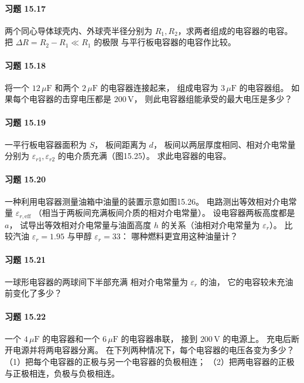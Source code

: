 \paragraph{习题 15.17}
两个同心导体球壳内、外球壳半径分别为
\(R_1,R_2\)，求两者组成的电容器的电容。
把 \(\Delta R=R_2-R_1\ll R_1\) 的极限
与平行板电容器的电容作比较。

\paragraph{习题 15.18}
将一个 \(12\,\mu\mathrm F\) 和两个
\(2\,\mu\mathrm F\) 的电容器连接起来，
组成电容为 \(3\,\mu\mathrm F\) 的电容器组。
如果每个电容器的击穿电压都是
\(200\,\mathrm V\)，
则此电容器组能承受的最大电压是多少？

\paragraph{习题 15.19}
一平行板电容器面积为 \(S\)，
板间距离为 \(d\)，
板间以两层厚度相同、相对介电常量分别为
\(\varepsilon_{r1},\varepsilon_{r2}\)
的电介质充满（图15.25）。
求此电容器的电容。

\paragraph{习题 15.20}
一种利用电容器测量油箱中油量的装置示意如图15.26。
电路测出等效相对介电常量
\(\varepsilon_{r,\mathrm{eff}}\)
（相当于两板间充满板间介质的相对介电常量）。
设电容器两板高度都是 \(a\)，
试导出等效相对介电常量与油面高度
\(h\) 的关系（油相对介电常量为 \(\varepsilon_r\)）。
比较汽油 \(\varepsilon_r=1.95\)
与甲醇 \(\varepsilon_r=33\)：
哪种燃料更宜用这种油量计？

\paragraph{习题 15.21}
一球形电容器的两球间下半部充满
相对介电常量为 \(\varepsilon_r\) 的油，
它的电容较未充油前变化了多少？

\paragraph{习题 15.22}
一个 \(4\,\mu\mathrm F\) 的电容器和一个
\(6\,\mu\mathrm F\) 的电容器串联，
接到 \(200\,\mathrm V\) 的电源上。
充电后断开电源并将两电容器分离。
在下列两种情况下，每个电容器的电压各变为多少？
（1）把每个电容器的正极与另一个电容器的负极相连；
（2）把两电容器的正极与正极相连，负极与负极相连。


